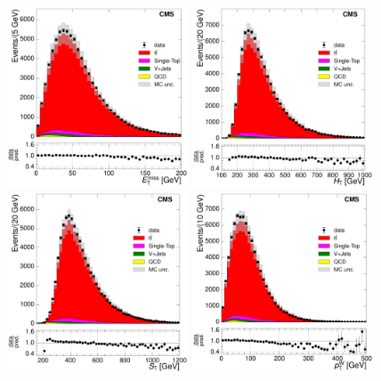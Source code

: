 \begin{figure}[hbtp]
    \centering
     \includegraphics[width=0.48\textwidth]{Chapters/04_Analysis/04b_XSections/images/control_plots/before_fit/7TeV/MuPlusJets_patType1CorrectedPFMet_2orMoreBtags_with_ratio.pdf}\hfill
     \includegraphics[width=0.48\textwidth]{Chapters/04_Analysis/04b_XSections/images/control_plots/before_fit/7TeV/MuPlusJets_HT_2orMoreBtags_with_ratio.pdf}\\
     \includegraphics[width=0.48\textwidth]{Chapters/04_Analysis/04b_XSections/images/control_plots/before_fit/7TeV/MuPlusJets_patType1CorrectedPFMet_ST_2orMoreBtags_with_ratio.pdf}\hfill
     \includegraphics[width=0.48\textwidth]{Chapters/04_Analysis/04b_XSections/images/control_plots/before_fit/7TeV/MuPlusJets_patType1CorrectedPFMet_WPT_2orMoreBtags_with_ratio.pdf}\\

\end{figure}
